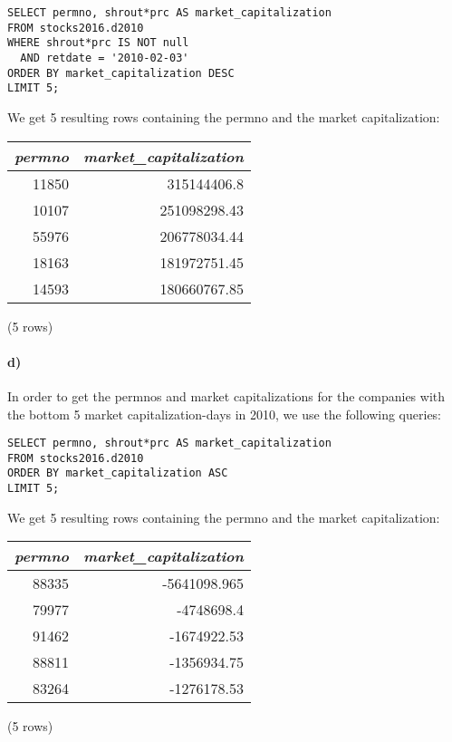 \documentclass[]{article}
\let\oldparagraph\paragraph
\renewcommand{\paragraph}[1]{\oldparagraph{#1}\mbox{}}
\begin{document}
\color{blue}
\begin{verbatim}
SELECT permno, shrout*prc AS market_capitalization
FROM stocks2016.d2010
WHERE shrout*prc IS NOT null
  AND retdate = '2010-02-03'
ORDER BY market_capitalization DESC
LIMIT 5;
\end{verbatim}
\color{black}

We get 5 resulting rows containing the permno and the market capitalization:

\begin{center}
\begin{tabular}{|r | r|}
\hline
\textit{permno} & \textit{market\_capitalization} \\
\hline
11850 & 315144406.8 \\
10107 & 251098298.43 \\
55976 & 206778034.44 \\
18163 & 181972751.45 \\
14593 & 180660767.85 \\
\hline
\end{tabular}

\noindent (5 rows) \\
\end{center}

\paragraph{d)}
In order to get the permnos and market capitalizations for the companies with the bottom 5 market capitalization-days in 2010, we use the following queries:

\color{blue}
\begin{verbatim}
SELECT permno, shrout*prc AS market_capitalization
FROM stocks2016.d2010
ORDER BY market_capitalization ASC
LIMIT 5;
\end{verbatim}
\color{black}

We get 5 resulting rows containing the permno and the market capitalization:

\begin{center}
\begin{tabular}{|r | r|}
\hline
\textit{permno} & \textit{market\_capitalization} \\
\hline
88335 & -5641098.965 \\
79977 & -4748698.4 \\
91462 & -1674922.53 \\
88811 & -1356934.75 \\
83264 & -1276178.53 \\
\hline
\end{tabular}

\noindent (5 rows) \\
\end{center}
\end{document}
